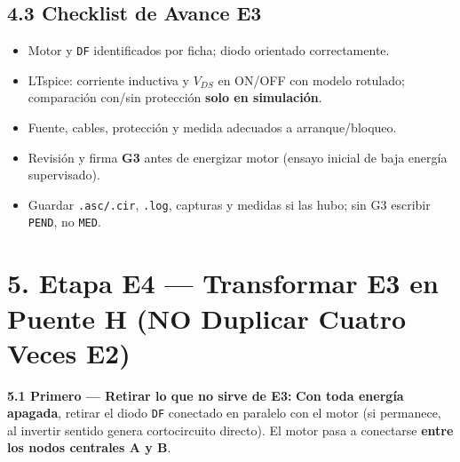 \documentclass[10pt, a4paper, landscape]{article}
\begin{document}
\begin{minipage}[t]{0.43\linewidth}
\subsection*{4.3 Checklist de Avance E3}
{\footnotesize
\begin{itemize}[label=$\square$, noitemsep, topsep=2pt]
    \item Motor y \texttt{DF} identificados por ficha; diodo orientado correctamente.
    \item LTspice: corriente inductiva y $V_{DS}$ en ON/OFF con modelo rotulado; comparación con/sin protección \textbf{solo en simulación}.
    \item Fuente, cables, protección y medida adecuados a arranque/bloqueo.
    \item Revisión y firma \textbf{G3} antes de energizar motor (ensayo inicial de baja energía supervisado).
    \item Guardar \texttt{.asc/.cir}, \texttt{.log}, capturas y medidas si las hubo; sin G3 escribir \texttt{PEND}, no \texttt{MED}.
\end{itemize}
}
\end{minipage}

\newpage
\section*{5. Etapa E4 — Transformar E3 en Puente H (NO Duplicar Cuatro Veces E2)}

\noindent
\textbf{\textcolor{warnred}{5.1 Primero — Retirar lo que no sirve de E3:}} \textbf{Con toda energía apagada}, retirar el diodo \texttt{DF} conectado en paralelo con el motor (si permanece, al invertir sentido genera cortocircuito directo). El motor pasa a conectarse \textbf{entre los nodos centrales A y B}.
\end{document}
